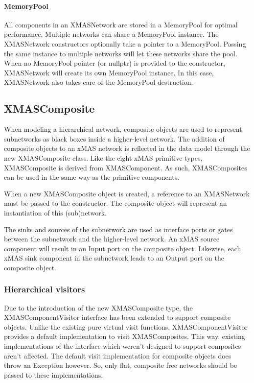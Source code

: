 \paragraph{MemoryPool}
All components in an XMASNetwork are stored in a MemoryPool for optimal performance.
Multiple networks can share a MemoryPool instance. The XMASNetwork constructors
optionally take a pointer to a MemoryPool. Passing the same instance to multiple
networks will let these networks share the pool. When no MemoryPool pointer (or
nullptr) is provided to the constructor, XMASNetwork will create its own
MemoryPool instance. In this case, XMASNetwork also takes care of the MemoryPool
destruction.


\subsection{XMASComposite}

When modeling a hierarchical network, composite objects are used to represent
subnetworks as black boxes inside a higher-level network. The addition of
composite objects to an xMAS network is reflected in the data model through the
new XMASComposite class. Like the eight xMAS primitive types, XMASComposite
is derived from XMASComponent. As such, XMASComposites can be used in the same
way as the primitive components.

When a new XMASComposite object is created, a reference to an XMASNetwork must
be passed to the constructor. The composite object will represent an
instantiation of this (sub)network.

The sinks and sources of the subnetwork are used as interface ports or gates
between the subnetwork and the higher-level network. An xMAS source component
will result in an Input port on the composite object. Likewise, each xMAS sink
component in the subnetwork leads to an Output port on the composite object.

\subsubsection{Hierarchical visitors}

Due to the introduction of the new XMASComposite type, the XMASComponentVisitor
interface has been extended to support composite objects. Unlike the existing
pure virtual visit functions, XMASComponentVisitor provides a default
implementation to visit XMASComposites. This way, existing implementations of
the interface which weren't designed to support composites aren't affected. The
default visit implementation for composite objects does throw an Exception however.
So, only flat, composite free networks should be passed to these implementations.


